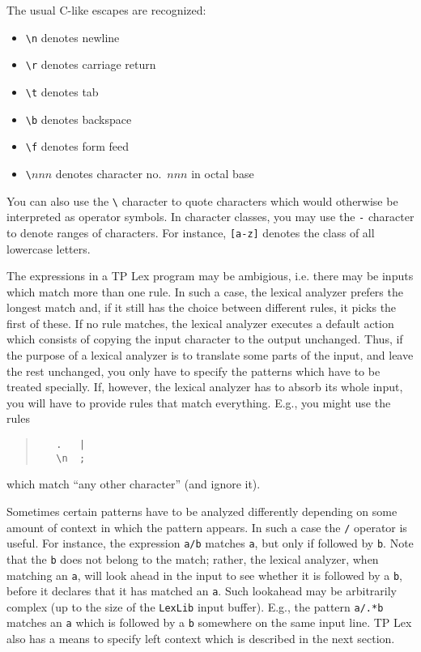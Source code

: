 The usual C-like escapes are recognized:
\begin{itemize}
   \item \verb"\n"     denotes newline
   \item \verb"\r"     denotes carriage return
   \item \verb"\t"     denotes tab
   \item \verb"\b"     denotes backspace
   \item \verb"\f"     denotes form feed
   \item \verb"\"$nnn$ denotes character no.\ $nnn$ in octal base
\end{itemize}

You can also use the \verb"\" character to quote characters which would
otherwise be interpreted as operator symbols. In character classes, you may
use the \verb"-" character to denote ranges of characters. For instance,
\verb"[a-z]" denotes the class of all lowercase letters.

The expressions in a TP Lex program may be ambigious, i.e. there may be inputs
which match more than one rule. In such a case, the lexical analyzer prefers
the longest match and, if it still has the choice between different rules,
it picks the first of these. If no rule matches, the lexical analyzer
executes a default action which consists of copying the input character
to the output unchanged. Thus, if the purpose of a lexical analyzer is
to translate some parts of the input, and leave the rest unchanged, you
only have to specify the patterns which have to be treated specially. If,
however, the lexical analyzer has to absorb its whole input, you will have
to provide rules that match everything. E.g., you might use the rules
\begin{quote}\begin{verbatim}
   .   |
   \n  ;
\end{verbatim}\end{quote}
which match ``any other character'' (and ignore it).

Sometimes certain patterns have to be analyzed differently depending on some
amount of context in which the pattern appears. In such a case the \verb"/"
operator is useful. For instance, the expression \verb"a/b" matches \verb"a",
but only if followed by \verb"b". Note that the \verb"b" does not belong to
the match; rather, the lexical analyzer, when matching an \verb"a", will look
ahead in the input to see whether it is followed by a \verb"b", before it
declares that it has matched an \verb"a". Such lookahead may be arbitrarily
complex (up to the size of the \verb"LexLib" input buffer). E.g., the pattern
\verb"a/.*b" matches an \verb"a" which is followed by a \verb"b" somewhere on
the same input line. TP Lex also has a means to specify left context which is
described in the next section.

